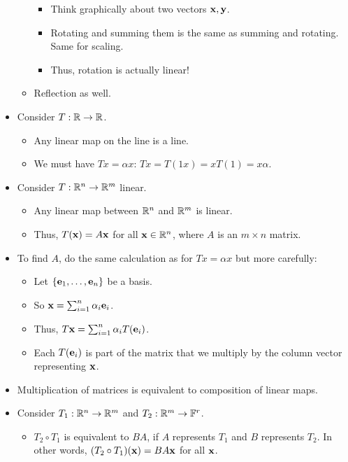 \documentclass[../../notes.tex]{subfiles}
\begin{document}
\begin{itemize}
\begin{itemize}
        \begin{itemize}
            \item Think graphically about two vectors $\mathbf{x},\mathbf{y}$.
            \item Rotating and summing them is the same as summing and rotating. Same for scaling.
            \item Thus, rotation is actually linear!
        \end{itemize}
        \item Reflection as well.
    \end{itemize}
    \item Consider $T:\mathbb{R}\to\mathbb{R}$.
    \begin{itemize}
        \item Any linear map on the line is a line.
        \item We must have $Tx=\alpha x$: $Tx=T(1x)=xT(1)=x\alpha$.
    \end{itemize}
    \item Consider $T:\mathbb{R}^n\to\mathbb{R}^m$ linear.
    \begin{itemize}
        \item Any linear map between $\mathbb{R}^n$ and $\mathbb{R}^m$ is linear.
        \item Thus, $T(\mathbf{x})=A\mathbf{x}$ for all $\mathbf{x}\in\mathbb{R}^n$, where $A$ is an $m\times n$ matrix.
    \end{itemize}
    \item To find $A$, do the same calculation as for $Tx=\alpha x$ but more carefully:
    \begin{itemize}
        \item Let $\{\mathbf{e}_1,\dots,\mathbf{e}_n\}$ be a basis.
        \item So $\mathbf{x}=\sum_{i=1}^n\alpha_i\mathbf{e}_i$.
        \item Thus, $T\mathbf{x}=\sum_{i=1}^n\alpha_iT(\mathbf{e}_i)$.
        \item Each $T(\mathbf{e}_i)$ is part of the matrix that we multiply by the column vector representing $\mathbf{x}$.
    \end{itemize}
    \item Multiplication of matrices is equivalent to composition of linear maps.
    \item Consider $T_1:\mathbb{R}^n\to\mathbb{R}^m$ and $T_2:\mathbb{R}^m\to\mathbb{F}^r$.
    \begin{itemize}
        \item $T_2\circ T_1$ is equivalent to $BA$, if $A$ represents $T_1$ and $B$ represents $T_2$. In other words, $(T_2\circ T_1)(\mathbf{x})=BA\mathbf{x}$ for all $\mathbf{x}$.
    \end{itemize}

\end{itemize}
\end{document}
